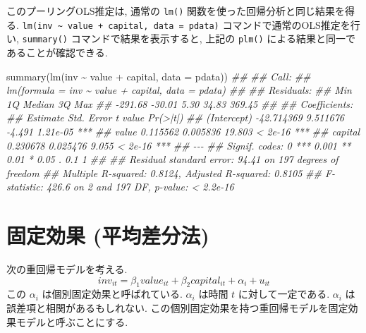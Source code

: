 \documentclass[
  letterpaper,
  xelatex,
  ja=standard, xelatex]{bxjsbook}
\newenvironment{Shaded}{\begin{snugshade}}{\end{snugshade}}
\newcommand{\AttributeTok}[1]{\textcolor[rgb]{0.40,0.45,0.13}{#1}}
\newcommand{\DocumentationTok}[1]{\textcolor[rgb]{0.37,0.37,0.37}{\textit{#1}}}
\newcommand{\FunctionTok}[1]{\textcolor[rgb]{0.28,0.35,0.67}{#1}}
\newcommand{\NormalTok}[1]{\textcolor[rgb]{0.00,0.23,0.31}{#1}}
\newcommand{\SpecialCharTok}[1]{\textcolor[rgb]{0.37,0.37,0.37}{#1}}
\begin{document}
このプーリングOLS推定は, 通常の \texttt{lm()}
関数を使った回帰分析と同じ結果を得る.
\texttt{lm(inv\ \textasciitilde{}\ value\ +\ capital,\ data\ =\ pdata)}
コマンドで通常のOLS推定を行い, \texttt{summary()}
コマンドで結果を表示すると, 上記の \texttt{plm()}
による結果と同一であることが確認できる.

\begin{Shaded}
\begin{Highlighting}[]
\FunctionTok{summary}\NormalTok{(}\FunctionTok{lm}\NormalTok{(inv }\SpecialCharTok{\textasciitilde{}}\NormalTok{ value }\SpecialCharTok{+}\NormalTok{ capital, }\AttributeTok{data =}\NormalTok{ pdata))}
\DocumentationTok{\#\# }
\DocumentationTok{\#\# Call:}
\DocumentationTok{\#\# lm(formula = inv \textasciitilde{} value + capital, data = pdata)}
\DocumentationTok{\#\# }
\DocumentationTok{\#\# Residuals:}
\DocumentationTok{\#\#     Min      1Q  Median      3Q     Max }
\DocumentationTok{\#\# {-}291.68  {-}30.01    5.30   34.83  369.45 }
\DocumentationTok{\#\# }
\DocumentationTok{\#\# Coefficients:}
\DocumentationTok{\#\#               Estimate Std. Error t value Pr(\textgreater{}|t|)    }
\DocumentationTok{\#\# (Intercept) {-}42.714369   9.511676  {-}4.491 1.21e{-}05 ***}
\DocumentationTok{\#\# value         0.115562   0.005836  19.803  \textless{} 2e{-}16 ***}
\DocumentationTok{\#\# capital       0.230678   0.025476   9.055  \textless{} 2e{-}16 ***}
\DocumentationTok{\#\# {-}{-}{-}}
\DocumentationTok{\#\# Signif. codes:  0 \textquotesingle{}***\textquotesingle{} 0.001 \textquotesingle{}**\textquotesingle{} 0.01 \textquotesingle{}*\textquotesingle{} 0.05 \textquotesingle{}.\textquotesingle{} 0.1 \textquotesingle{} \textquotesingle{} 1}
\DocumentationTok{\#\# }
\DocumentationTok{\#\# Residual standard error: 94.41 on 197 degrees of freedom}
\DocumentationTok{\#\# Multiple R{-}squared:  0.8124, Adjusted R{-}squared:  0.8105 }
\DocumentationTok{\#\# F{-}statistic: 426.6 on 2 and 197 DF,  p{-}value: \textless{} 2.2e{-}16}
\end{Highlighting}
\end{Shaded}

\section{固定効果
(平均差分法)}\label{ux56faux5b9aux52b9ux679c-ux5e73ux5747ux5deeux5206ux6cd5}

次の重回帰モデルを考える. \[
inv_{it} = \beta_1 value_{it} + \beta_2 capital_{it} +\alpha_i + u_{it}
\] この \(\alpha_i\) は個別固定効果と呼ばれている. \(\alpha_i\) は時間
\(t\) に対して一定である. \(\alpha_i\) は誤差項と相関があるもしれない.
この個別固定効果を持つ重回帰モデルを固定効果モデルと呼ぶことにする.
\end{document}
